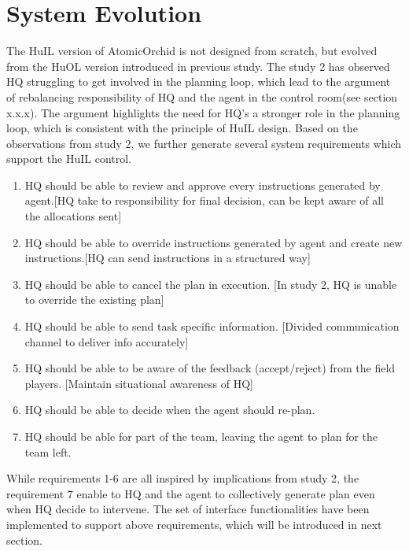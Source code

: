 \section{System Evolution}
The HuIL version of AtomicOrchid is not designed from scratch, but evolved from the HuOL version introduced in previous study. The study 2 has observed HQ struggling to get involved in the planning loop, which lead to the argument of rebalancing responsibility of HQ and the agent in the control room(see section x.x.x). The argument highlights the need for HQ's a stronger role  in the planning loop, which is consistent with the principle of HuIL design. Based on the observations from study 2, we further generate several system requirements which support the HuIL control. \\


\begin{enumerate}
\item HQ should be able to review and approve every instructions generated by agent.[HQ take to responsibility for final decision, can be kept aware of all the allocations sent]
\item HQ should be able to override instructions generated by agent and create new instructions.[HQ can send instructions in a structured way]
\item HQ should be able to cancel the plan in execution. [In study 2, HQ is unable to override the existing plan]
\item HQ should be able to send task specific information. [Divided communication channel to deliver info accurately]
\item HQ should be able to be aware of the feedback (accept/reject) from the field players. [Maintain situational awareness of HQ]
\item HQ should be able to decide when the agent should re-plan. 
\item HQ should be able for part of the team, leaving the agent to plan for the team left. 
\end{enumerate}

While requirements 1-6 are all inspired by implications from study 2, the requirement 7 enable to HQ and the agent to collectively generate plan even when HQ decide to intervene. The set of interface functionalities have been implemented to support above requirements, which will be introduced in next section. 


 
